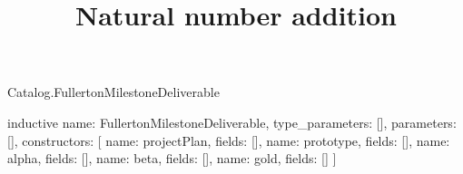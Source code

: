 \begin{lexlean}{Catalog.FullertonMilestoneDeliverable}
\title{Natural number addition}
\begin{semanticmodule}
inductive{
  name: FullertonMilestoneDeliverable,
  type_parameters: [],
  parameters: [],
  constructors: [
    {name: projectPlan, fields: []},
    {name: prototype, fields: []},
    {name: alpha, fields: []},
    {name: beta, fields: []},
    {name: gold, fields: []}
  ]
}
\end{semanticmodule}
\end{lexlean}
